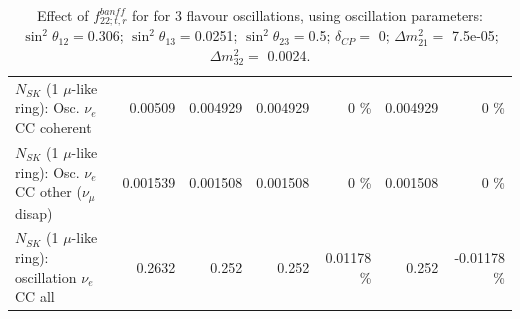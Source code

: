\begin{table}
\begin{tabular}{| l | r | r | r  r | r  r |}
                          $N_{SK}$ (1 $\mu$-like ring): Osc. $\nu_e$ CC coherent &         0.00509 &        0.004929 &        0.004929 &        0 \%  &        0.004929 &        0 \%  \\ 
           $N_{SK}$ (1 $\mu$-like ring): Osc. $\nu_e$ CC other ($\nu_\mu$ disap) &        0.001539 &        0.001508 &        0.001508 &        0 \%  &        0.001508 &        0 \%  \\ 
                        $N_{SK}$ (1 $\mu$-like ring): oscillation $\nu_e$ CC all &          0.2632 &           0.252 &           0.252 &  0.01178 \%  &           0.252 & -0.01178 \%  \\ 
\hline
\hline
\end{tabular}
\caption{ Effect of $f_{22; t, r}^{banff}$ for for 3 flavour oscillations, using oscillation parameters:  $\sin^2\theta_{12} = $0.306; $\sin^2\theta_{13} = $0.0251; $\sin^2\theta_{23} = $0.5; $\delta_{CP} = $        0; $\Delta m^2_{21} = $    7.5e-05; $\Delta m^2_{32} = $    0.0024. }
\label{tab:num_banff_cc1piE1_1RmuT_3f_osc_t13:0.0251}
\end{table}
\clearpage
